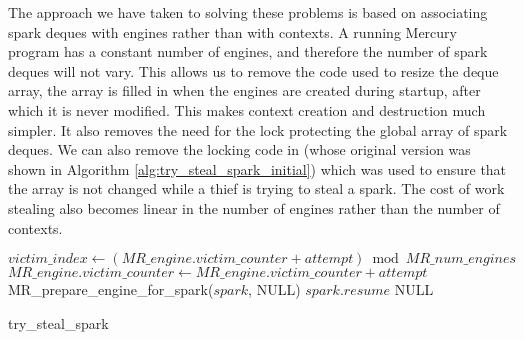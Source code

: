 The approach we have taken to solving these problems is based on associating
spark deques with engines rather than with contexts.
A running Mercury program has a constant number of engines,
and therefore the number of spark deques will not vary.
This allows us to remove the code used to resize the deque array,
the array is filled in when the engines are created during startup,
after which it is never modified.
This makes context creation and destruction much simpler.
It also removes the need for the lock protecting the global array of spark
deques.
We can also remove the locking code in \trystealspark
(whose original version was shown in Algorithm
\ref{alg:try_steal_spark_initial})
which was used to
ensure that the array is not changed while a thief is trying to steal a
spark.
The cost of work stealing also becomes linear in the number of engines
rather than the number of contexts.

\begin{algorithm}[tbp]
\begin{algorithmic}
      \State $victim\_index \gets
          (MR\_engine.victim\_counter + attempt) \bmod MR\_num\_engines$
        \State $MR\_engine.victim\_counter \gets
          MR\_engine.victim\_counter + attempt$
        \State MR\_prepare\_engine\_for\_spark($spark$, NULL)
        \State \Return $spark.resume$
      \EndIf
    \EndFor
  \EndIf
  \State \Return NULL
\EndProcedure
\end{algorithmic}
\caption{try\_steal\_spark}
\label{alg:try_steal_spark_revised}
\end{algorithm}

